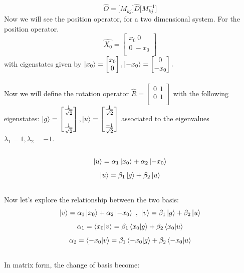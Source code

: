 \documentclass{article}
\begin{document}
  $$ \hat{O} =  \Bigr[M_{kj} \Bigr] \hat{D} \Bigr[ M_{kj}^{-1} \Bigr] $$
Now we will see the position operator, for a two dimensional system. For the position operator.
$$ \hat{X_0} = \begin{bmatrix}
    x_0 \ 0 \\
    0    \ -x_0 \\
\end{bmatrix}$$
with eigenstates given by $ \ket{x_0} = \begin{bmatrix}
    x_0 \\
    0 \\
\end{bmatrix} , \ket{-x_0} = \begin{bmatrix}
    0 \\
    -x_0 \\
\end{bmatrix}. $ \\ \\ 
Now we will define the rotation operator $\hat{R} = \begin{bmatrix}
    0 \ \ 1 \\
    0 \  \ 1 \\
\end{bmatrix}$ with the following eigenstates: $ \ket{g} = \begin{bmatrix}
\frac{1}{\sqrt2} \\ \\
\frac{1}{\sqrt2}
\end{bmatrix}, \ket{u} = \begin{bmatrix}
    \frac{1}{\sqrt2} \\ \\
    \frac{-1}{\sqrt2}
\end{bmatrix}$ associated to the eigenvalues $ \lambda_1 = 1, \lambda_2 = -1$. \\  \\
$$\ket{u} = \alpha_1 \ket{x_0} + \alpha_2 \ket{-x_0}$$
$$\ket{u} = \beta_1 \ket{g} + \beta_2 \ket{u}$$ \\
Now let's explore the relationship between the two basis:\\
$$\ket{v} = \alpha_1 \ket{x_0} + \alpha_2 \ket{-x_0} \ , \
\ket{v} = \beta_1 \ket{g}  + \beta_2 \ket{u} $$ 
$$ \alpha_1 =  \bra{x_0}\ket{v} = \beta_1 \bra{x_0}\ket{g} + \beta_2 \bra{x_0}\ket{u}$$
$$ \alpha_2 =  \bra{-x_0}\ket{v} = \beta_1 \bra{-x_0}\ket{g} + \beta_2 \bra{-x_0}\ket{u}$$\\
In matrix form, the change of basis become: \\
\end{document}
